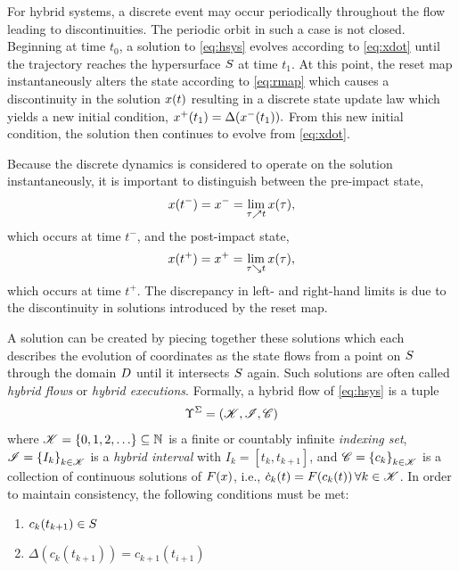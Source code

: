For hybrid systems, a discrete event may occur periodically throughout the flow
leading to discontinuities.
%
The periodic orbit in such a case is not closed.
%
Beginning at time $t_{0}$, a solution to \eqref{eq:hsys} evolves according to
\eqref{eq:xdot} until the trajectory reaches the hypersurface $S$ at time
$t_{1}$.
%
At this point, the reset map instantaneously alters the state according to
\eqref{eq:rmap} which causes a discontinuity in the solution $x(t)$ resulting
in a discrete state update law which yields a new initial condition, $x^{+}(t_{1})
= \Delta(x^{-}(t_{1})).$
%
From this new initial condition, the solution then continues to evolve from
\eqref{eq:xdot}.

Because the discrete dynamics is considered to operate on the solution
instantaneously, it is important to distinguish between the pre-impact state,
\begin{align*}
  x(t^{-}) = x^{-} = \lim_{\tau \nearrow t} x(\tau),
\end{align*}
which occurs at time $t^{-}$, and the post-impact state,
\begin{align*}
  x(t^{+}) = x^{+} = \lim_{\tau \searrow t} x(\tau),
\end{align*}
which occurs at time $t^{+}$.
%
The discrepancy in left- and right-hand limits is due to the discontinuity in
solutions introduced by the reset map.
%

A solution can be created by piecing together these solutions which each
describes the evolution of coordinates as the state flows from a point on
$S$ through the domain $D$ until it intersects $S$ again.
%
Such solutions are often called {\em hybrid flows} or {\em hybrid executions}.
%
Formally, a hybrid flow of \eqref{eq:hsys} is a tuple
\begin{align*}
  \Upsilon^{\Sigma} = \left( \mathscr{K}, \mathscr{I}, \mathscr{C} \right)
\end{align*}
where $\mathscr{K} = \{0, 1, 2, \ldots\} \subseteq \mathbb{N}$ is a finite or countably
infinite {\em indexing set}, $\mathscr{I} = \left\{I_{k}\right\}_{k \in \mathscr{K}}$ is a {\em
  hybrid interval} with $I_{k} = \left[t_{k}, t_{k+1}\right]$, and $\mathscr{C} =
\left\{c_{k}\right\}_{k \in \mathscr{K}}$ is a collection of continuous solutions of
$F(x)$, i.e., ${\dot c}_{k}(t) = F(c_{k}(t)) \, \forall k \in \mathscr{K}$.
%
In order to maintain consistency, the following conditions must be met:
%
\begin{enumerate}
\item $c_{k}(t_{k+1}) \in S$
\item $\Delta(c_{k}(t_{k+1})) = c_{k+1}(t_{i+1})$
\end{enumerate}

